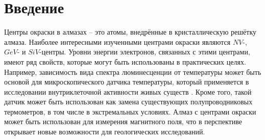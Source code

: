 \section{Введение}
Центры окраски в алмазах -- это атомы, внедрённые в кристаллическую решётку
алмаза. Наиболее интересными изученными центрами окраски являются $NV$-, $GeV$-
и $SiV$-центры. Уровни энергии электронов, связанных с этими центрами, имеют ряд
свойств, которые могут быть использованы в практических целях. Например, 
зависимость вида спектра люминесценции от температуры может быть основой для микроскопического
датчика температуры, который применяется в исследовании внутриклеточной активности
живых существ \cite{Therm}. Кроме того, такой датчик может быть использован
как замена существующих полупроводниковых термометров, в том числе в экстремальных
условиях. Алмаз с центрами окраски может быть использован для измерения магнитного
поля, что в перспективе открывает новые возможности для геологических исследований. 



